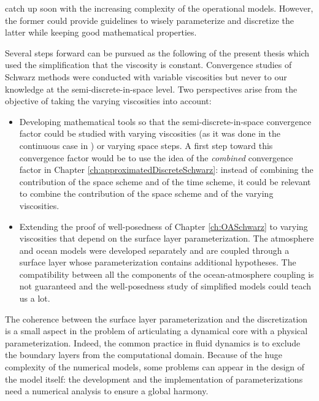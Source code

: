 catch up soon with the increasing complexity
of the operational models. However,
the former could provide guidelines to wisely
parameterize and discretize the latter while keeping
good mathematical properties.
\par
Several steps forward can be pursued as the
following of the present thesis which used the
simplification that the viscosity is constant.
Convergence studies of Schwarz methods
were conducted with variable viscosities but
never to our knowledge at the semi-discrete-in-space level.
Two perspectives arise from the objective of taking the
varying viscosities into account:
\begin{itemize}
	\item Developing mathematical tools so that the
		semi-discrete-in-space convergence factor could
		be studied with varying viscosities (as it was done
		in the continuous case in \citep{thery_etude_2021})
		or varying space steps.
		A first step toward this convergence factor
		would be to use the idea of the \textit{combined}
		convergence factor in
		Chapter \ref{ch:approximatedDiscreteSchwarz}:
		instead of combining the contribution of the
		space scheme and of the time scheme, it could
		be relevant to combine the contribution of
		the space scheme and of the varying viscosities.
	\item Extending the proof of well-posedness of Chapter
		\ref{ch:OASchwarz} to varying viscosities
		that depend on the surface layer parameterization.
		The atmosphere and ocean models were developed 
		separately and are coupled through a surface
		layer whose parameterization contains additional
		hypotheses. The compatibility between all the
		components of the ocean-atmosphere coupling
		is not guaranteed and the well-posedness
		study of simplified models could teach us a lot.
\end{itemize}
The coherence between the surface layer parameterization and
the discretization is a small aspect in the problem of
articulating a dynamical core with a physical parameterization.
Indeed, the common practice in fluid dynamics is to exclude
the boundary layers from the computational domain.
Because of the huge complexity of the numerical models, some
problems can appear in the design of the model itself:
the development and the implementation of parameterizations
need a numerical analysis to ensure a global harmony.
